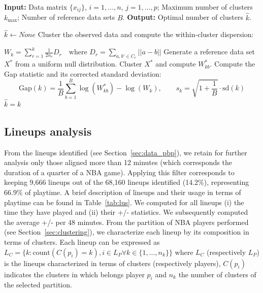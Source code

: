 \begin{algorithm}
\caption{Gap Statistic (from )}
\footnotesize
\label{alg:gs}
\begin{algorithmic}

  \Statex \textbf{Input:} Data matrix $\{x_{ij}\}$, $i = 1, \ldots, n$, $j = 1, \ldots, p$; 
  \Statex \hspace{3em} Maximum number of clusters $k_{\max}$; 
  \Statex \hspace{3em} Number of reference data sets $B$.
  \Statex \textbf{Output:} Optimal number of clusters $\hat{k}$.

\State $\hat{k} \gets None $
    \State Cluster the observed data and compute the within-cluster dispersion:

    $W_k = \sum_{r=1}^{k} \frac{1}{2n_r} D_r \quad \text{where } D_r = \sum_{a,b' \in C_r} ||a - b||$
        \State Generate a reference data set $X^*$ from a uniform null distribution.
        \State Cluster $X^*$ and compute $W_{kb}^*$.
        \EndFor
      \State Compute the Gap statistic and its corrected standard deviation:
      $$\mathrm{Gap}(k) = \frac{1}{B} \sum_{b=1}^{B} \log(W_{kb}^*) - \log(W_k), 
      \qquad s_k = \sqrt{1 + \frac{1}{B}} \cdot \mathrm{sd}(k)$$
        \State $\hat{k} = k$ 
      \EndIf
  \EndWhile
\EndFor

\end{algorithmic}
\end{algorithm}


\subsection{Lineups analysis}
\label{sec:lineup_analysis}

From the lineups identified (see Section~\ref{sec:data_pbp}), we retain for further analysis only those aligned more than 12 minutes (which corresponds the duration of a quarter of a NBA game).
Applying this filter corresponds to keeping 9,666 lineups out of the 68,160 lineups identified (14.2\%), representing 66.9\% of playtime.
A brief description of lineups and their usage in terms of playtime can be found in Table~\ref{tab:lus}.
We computed for all lineups (i) the time they have played and (ii) their +/- statistics.
We subsequently computed the average +/- per 48 minutes.
From the partition of NBA players performed (see Section~\ref{sec:clustering}), we characterize each lineup by its composition in terms of clusters.
Each lineup can be expressed as $L_C = \{k : \text{count}(C(p_i) = k), i \in L_P \forall k \in \{1, ..., n_k\}\}$ where $L_C$ (respectively $L_P$) is the lineups characterized in terms of clusters (respectively players), $C(p_i)$ indicates the clusters in which belongs player $p_i$ and $n_k$ the number of clusters of the selected partition. 

